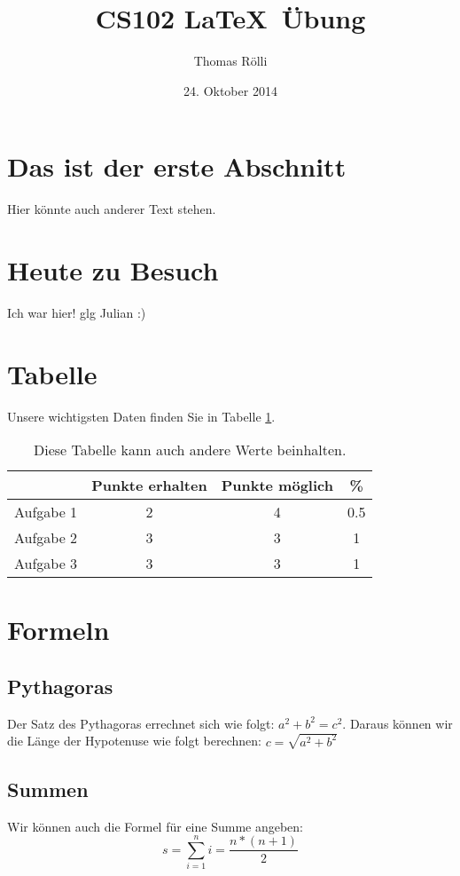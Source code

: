 \documentclass[11pt,a4paper]{article}
\date{24. Oktober 2014}
\author{Thomas Rölli}
\title{CS102 \LaTeX\ Übung}
\begin{document}
\maketitle

\section{Das ist der erste Abschnitt}
Hier könnte auch anderer Text stehen.
\section{Heute zu Besuch}
Ich war hier! glg Julian :)
\section{Tabelle}
Unsere wichtigsten Daten finden Sie in Tabelle \ref{tab1}.
\begin{table}[h]
\centering
\begin{tabular}{c|c|c|c}
& Punkte erhalten & Punkte möglich & \% \\
\hline
Aufgabe 1 & 2 & 4 & 0.5 \\
Aufgabe 2 & 3 & 3 & 1 \\
Aufgabe 3 & 3 & 3 & 1 \\
\end{tabular}
\caption{Diese Tabelle kann auch andere Werte beinhalten.}
\label{tab1}
\end{table}
\section{Formeln}
\subsection{Pythagoras}
Der Satz des Pythagoras errechnet sich wie folgt: $a^2+b^2=c^2$. Daraus können wir die Länge der Hypotenuse wie folgt berechnen: $c=\sqrt{a^2+b^2}$
\subsection{Summen}
Wir können auch die Formel für eine Summe angeben:
\begin{equation}
s=\sum_{i=1}^{n}i=\frac{n*(n+1)}{2}
\end{equation}
\end{document}
